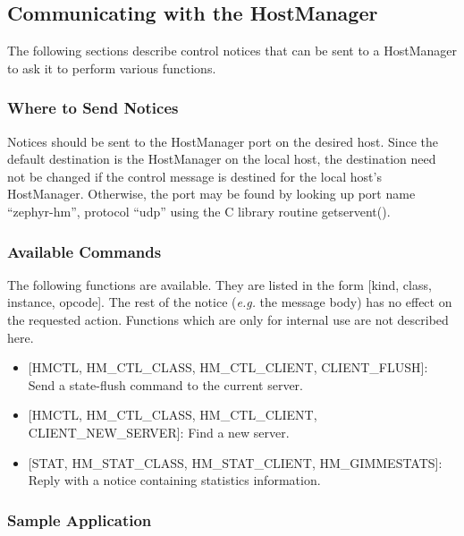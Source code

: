 %
\subsection{Communicating with the HostManager}
\label{comm-hostmanager}

The following sections describe control notices that can be
sent to a HostManager to ask it to perform various functions.

\subsubsection{Where to Send Notices}

Notices should be sent to the HostManager port on the desired host.
Since the default destination is the HostManager on the local host,
the destination need not be changed if the control message is
destined for the local host's HostManager.  Otherwise, the port may
be found by looking up port name ``zephyr-hm'', protocol ``udp'' using
the C library routine getservent().

\subsubsection{Available Commands}

The following functions are available.  They are listed in the form
[kind, class, instance, opcode].  The rest of the notice ({\em e.g.\/}
the message body) has no effect on the requested action.  Functions
which are only for internal use are not described here.

\begin{itemize}
\item {[HMCTL, HM_CTL_CLASS, HM_CTL_CLIENT, CLIENT_FLUSH]}:
Send a state-flush command to the current server.
\item {[HMCTL, HM_CTL_CLASS, HM_CTL_CLIENT, CLIENT_NEW_SERVER]}:
Find a new server.
\item {[STAT, HM_STAT_CLASS, HM_STAT_CLIENT, HM_GIMMESTATS]}: Reply with a
notice containing statistics information.
\end{itemize}

\subsubsection{Sample Application}

